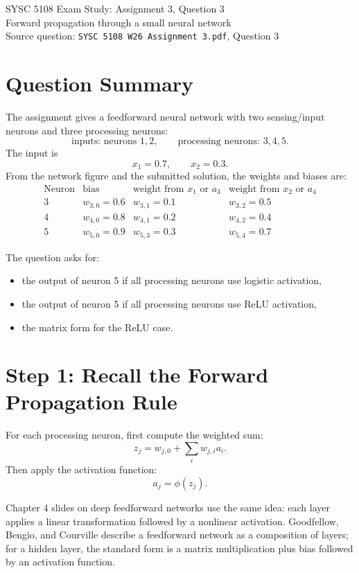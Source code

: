 \documentclass[11pt]{article}
\begin{document}
\begin{center}
{\Large SYSC 5108 Exam Study: Assignment 3, Question 3}\\
\vspace{0.3em}
{\large Forward propagation through a small neural network}\\
\vspace{0.3em}
Source question: \texttt{SYSC 5108 W26 Assignment 3.pdf}, Question 3
\end{center}

\section*{Question Summary}

The assignment gives a feedforward neural network with two sensing/input neurons and three processing neurons:
\[
\text{inputs: neurons }1,2,\qquad
\text{processing neurons: }3,4,5.
\]
The input is
\[
x_1=0.7,\qquad x_2=0.3.
\]
From the network figure and the submitted solution, the weights and biases are:
\[
\begin{array}{c|ccc}
\text{Neuron} & \text{bias} & \text{weight from }x_1\text{ or }a_3 & \text{weight from }x_2\text{ or }a_4\\
\hline
3 & w_{3,0}=0.6 & w_{3,1}=0.1 & w_{3,2}=0.5\\
4 & w_{4,0}=0.8 & w_{4,1}=0.2 & w_{4,2}=0.4\\
5 & w_{5,0}=0.9 & w_{5,3}=0.3 & w_{5,4}=0.7
\end{array}
\]

The question asks for:
\begin{itemize}
\item the output of neuron 5 if all processing neurons use logistic activation,
\item the output of neuron 5 if all processing neurons use ReLU activation,
\item the matrix form for the ReLU case.
\end{itemize}

\section*{Step 1: Recall the Forward Propagation Rule}

For each processing neuron, first compute the weighted sum:
\[
z_j=w_{j,0}+\sum_i w_{j,i}a_i.
\]
Then apply the activation function:
\[
a_j=\phi(z_j).
\]

Chapter 4 slides on deep feedforward networks use the same idea: each layer applies a linear transformation followed by a nonlinear activation. Goodfellow, Bengio, and Courville describe a feedforward network as a composition of layers; for a hidden layer, the standard form is a matrix multiplication plus bias followed by an activation function.
\end{document}

